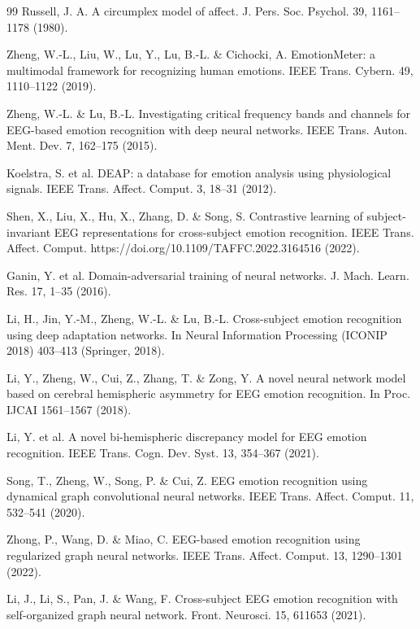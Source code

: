 \begin{thebibliography}{99}
 Russell, J. A. A circumplex model of affect. J. Pers. Soc. Psychol. 39, 1161–1178 (1980).

 Zheng, W.-L., Liu, W., Lu, Y., Lu, B.-L. \& Cichocki, A. EmotionMeter: a multimodal framework for recognizing human emotions. IEEE Trans. Cybern. 49, 1110–1122 (2019).

 Zheng, W.-L. \& Lu, B.-L. Investigating critical frequency bands and channels for EEG-based emotion recognition with deep neural networks. IEEE Trans. Auton. Ment. Dev. 7, 162–175 (2015).

 Koelstra, S. et al. DEAP: a database for emotion analysis using physiological signals. IEEE Trans. Affect. Comput. 3, 18–31 (2012).

 Shen, X., Liu, X., Hu, X., Zhang, D. \& Song, S. Contrastive learning of subject-invariant EEG representations for cross-subject emotion recognition. IEEE Trans. Affect. Comput. https://doi.org/10.1109/TAFFC.2022.3164516 (2022). 

 Ganin, Y. et al. Domain-adversarial training of neural networks. J. Mach. Learn. Res. 17, 1–35 (2016).

 Li, H., Jin, Y.-M., Zheng, W.-L. \& Lu, B.-L. Cross-subject emotion recognition using deep adaptation networks. In Neural Information Processing (ICONIP 2018) 403–413 (Springer, 2018).

 Li, Y., Zheng, W., Cui, Z., Zhang, T. \& Zong, Y. A novel neural network model based on cerebral hemispheric asymmetry for EEG emotion recognition. In Proc. IJCAI 1561–1567 (2018).

 Li, Y. et al. A novel bi-hemispheric discrepancy model for EEG emotion recognition. IEEE Trans. Cogn. Dev. Syst. 13, 354–367 (2021).

 Song, T., Zheng, W., Song, P. \& Cui, Z. EEG emotion recognition using dynamical graph convolutional neural networks. IEEE Trans. Affect. Comput. 11, 532–541 (2020).

 Zhong, P., Wang, D. \& Miao, C. EEG-based emotion recognition using regularized graph neural networks. IEEE Trans. Affect. Comput. 13, 1290–1301 (2022).

 Li, J., Li, S., Pan, J. \& Wang, F. Cross-subject EEG emotion recognition with self-organized graph neural network. Front. Neurosci. 15, 611653 (2021).


\end{thebibliography}
